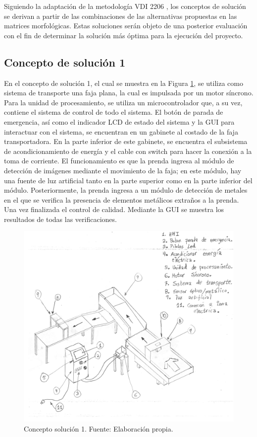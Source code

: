 Siguiendo la adaptación de la metodología VDI 2206 \cite{VDIVDE2206_2021}, los conceptos de solución se derivan a partir de las combinaciones de las alternativas propuestas en las matrices morfológicas. Estas soluciones serán objeto de una posterior evaluación con el fin de determinar la solución más óptima para la ejecución del proyecto.

\subsection{Concepto de solución 1}

En el concepto de solución 1, el cual se muestra en la Figura \ref{fig:sketch_CS_1}, se utiliza como sistema de transporte una faja plana, la cual es impulsada por un motor síncrono. Para la unidad de procesamiento, se utiliza un microcontrolador que, a su vez, contiene el sistema de control de todo el sistema. El botón de parada de emergencia, así como el indicador LCD de estado del sistema y la GUI para interactuar con el sistema, se encuentran en un gabinete al costado de la faja transportadora. En la parte inferior de este gabinete, se encuentra el subsistema de acondicionamiento de energía y el cable con switch para hacer la conexión a la toma de corriente. El funcionamiento es que la prenda ingresa al módulo de detección de imágenes mediante el movimiento de la faja; en este módulo, hay una fuente de luz artificial tanto en la parte superior como en la parte inferior del módulo. Posteriormente, la prenda ingresa a un módulo de detección de metales en el que se verifica la presencia de elementos metálicos extraños a la prenda. Una vez finalizada el control de calidad. Mediante la GUI se muestra los resultados de todas las verificaciones.

\begin{figure}[H]
	\centering
	\includegraphics[page=3,width=\textwidth]{img/sketch_CS.pdf}
	\caption[Concepto solución 1.]{Concepto solución 1. Fuente: Elaboración propia.}
	\label{fig:sketch_CS_1}
\end{figure}

